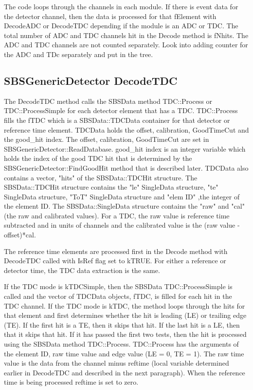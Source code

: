 \documentclass[11pt]{article}
\begin{document}
The code loops through the  channels in each module. 
If there is event data for the detector channel,
then the data is processed for that fElement  with DecodeADC or DecodeTDC 
depending if the module is an ADC or TDC.
The total number of  ADC and TDC channels hit in the Decode method  is fNhits. The ADC and TDC channels
are not counted separately. {\color{red}  Look into adding counter for the ADC and TDc separately and put in the tree.}

\subsection{SBSGenericDetector DecodeTDC}
The DecodeTDC method calls the SBSData method TDC::Process or TDC::ProcessSimple for each detector element that has a TDC.
TDC::Process fills the fTDC which is a SBSData::TDCData container for that detector or reference time element. 
TDCData holds the offset, calibration, GoodTimeCut and the good\_hit index. The  offset, calibration, GoodTimeCut
are set in SBSGenericDetector::ReadDatabase. good\_hit index is an integer variable
which holds the index of the good TDC hit that is determined by the SBSGenericDetector::FindGoodHit method 
that is described later. TDCData also contains a vector, "hits"  of the SBSData::TDCHit structure. 
The  SBSData::TDCHit structure contains the "le" SingleData structure, "te" SingleData structure,
"ToT" SingleData structure and "elem ID" ,the integer of the element ID. The SBSData::SingleData structure contains
the "raw" and "cal" (the raw and calibrated values). For a TDC, the raw value is reference time subtracted and in units of channels and the calibrated value is the (raw value - offset)*cal.

The reference time elements are processed first in the Decode method with DecodeTDC called with IsRef flag
set to kTRUE.
For either a reference or detector time, the TDC data extraction is the same. 

If the
TDC mode is kTDCSimple, then the SBSData TDC::ProcessSimple is called and the vector of  TDCData objects, fTDC,
is filled for each hit in the TDC channel. 
If the TDC mode is kTDC, the method loops through the hits for that element 
and first determines whether the hit is leading (LE)  or trailing edge (TE).
If the first hit is a TE, then it skips that hit. If the last hit is a LE, then that it skips that hit.
If it has passed the first two tests, then the hit is processed using the SBSData method TDC::Process.
TDC::Process has the arguments of the element ID, raw time value and edge value (LE = 0, TE = 1).
The raw time value is the data from the channel minus reftime (local variable determined earlier in DecodeTDC and described in the next paragraph).
When the reference time is being processed reftime is set to zero.
\end{document}
